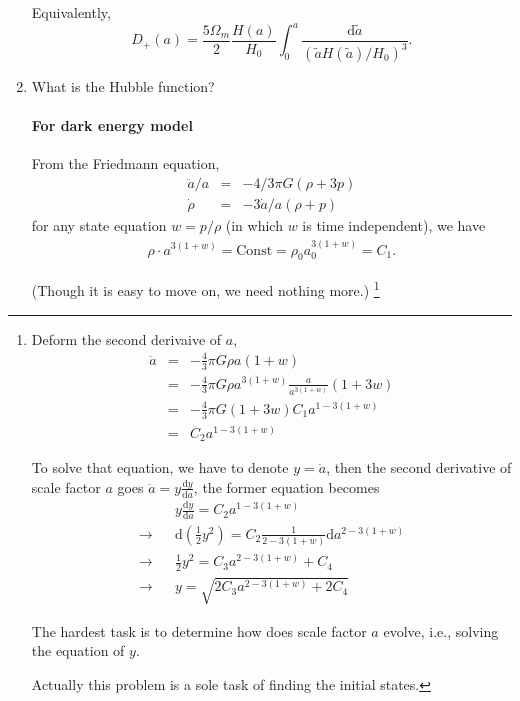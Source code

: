 \begin{enumerate}
Equivalently, 
\begin{equation}
D_+(a)=\frac{5\Omega_m}{2}\frac{H(a)}{H_0}\int^a_0 \frac{\mathrm d \tilde{a}}{(\tilde a H(\tilde a)/H_0)^3}  .
\end{equation}



\item
What is the Hubble function?
\paragraph{For dark energy model} 
From the Friedmann equation, 
\begin{eqnarray}
\ddot a/a&=&-4/3\pi G(\rho+3p) \\
\dot \rho&=&-3\dot a/a(\rho+p)
\end{eqnarray}
for any state equation $w=p/\rho$ (in which $w$ is time independent), we have 
\begin{eqnarray}
\rho\cdot a^{3(1+w)}=\text{Const}=\rho_0 a_0^{3(1+w)}=C_1.
\end{eqnarray}

(Though it is easy to move on, we need nothing more.)
\footnote{Deform the second derivaive of $a$, 
\begin{eqnarray}
\ddot a&=&-\frac 4 3 \pi G \rho a (1+w) \\
&=&-\frac 4 3 \pi G \rho a^{3(1+w)}\frac{a}{a^{3(1+w)}} (1+3w) \\
&=&-\frac 4 3 \pi G (1+3w) C_1 a^{1-3(1+w)} \\
&=&C_2 a^{1-3(1+w)}
\end{eqnarray}

To solve that equation, we have to denote $y=\dot a$, then the second derivative of scale factor $a$ goes $\ddot a=y \frac{\mathrm d y}{\mathrm d a}$, the former equation becomes
\begin{eqnarray}
&&y\frac{\mathrm d y}{\mathrm da}=C_2a^{1-3(1+w)}\\
\rightarrow && \mathrm d (\frac 1 2 y^2)= C_2 \frac 1 {2-3(1+w)} \mathrm d a^{2-3(1+w)} \\
\rightarrow && \frac 1 2 y^2=C_3a^{2-3(1+w)}+C_4 \\
\rightarrow && y=\sqrt{ 2C_3 a^{2-3(1+w)} +2 C_4 }
\end{eqnarray}
																			
The hardest task is to determine how does scale factor $a$ evolve, i.e., solving the equation of $y$.

Actually this problem is a sole task of finding the initial states.}



\end{enumerate}
